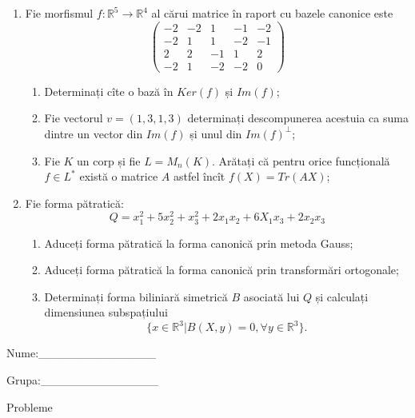 \documentclass{article}
\begin{document}
\begin{enumerate}
 \item Fie morfismul $f:\mathbb{R}^5 \to \mathbb{R}^4$ al cărui matrice în raport cu bazele canonice este
$$\begin{pmatrix}
-2&-2&1&-1&-2\\
-2&1&1&-2&-1\\
2&2&-1&1&2\\
-2&1&-2&-2&0
\end{pmatrix}$$

\begin{enumerate}
\item Determinați cîte o bază în $Ker(f)$ și $Im(f)$;
\item Fie vectorul $v=(1,3,1,3)$ determinați descompunerea acestuia ca suma dintre un vector din $Im(f)$ și unul din $Im(f)^\perp$;
\item Fie $K$ un corp și fie $L=M_n(K)$. Arătați că pentru orice funcțională $f \in L^*$ există o matrice $A$ astfel încît $f(X)=Tr(AX)$;
\end{enumerate}
\item Fie forma pătratică:
$$Q= x_1^2+5x_2^2+x_3^2+2x_1x_2+6X_1x_3+2x_2x_3$$

\begin{enumerate}
\item Aduceți forma pătratică la forma canonică prin metoda Gauss;
\item Aduceți forma pătratică la forma canonică prin transformări ortogonale;
\item Determinați forma biliniară simetrică $B$ asociată lui $Q$ și calculați dimensiunea subspațiului
$$\{x \in \mathbb{R}^3 | B(X,y)=0,\forall y \in \mathbb{R}^3\}.$$

\end{enumerate}
\end{enumerate}
\newpage
\begin{flushright}
Nume:\_\_\_\_\_\_\_\_\_\_\_\_\_\_
 
 
Grupa:\_\_\_\_\_\_\_\_\_\_\_\_\_\_
\end{flushright}
\begin{center}
\vspace{2cm}
{\Large Probleme}
\vspace{2cm}
\end{center}
\end{document}
